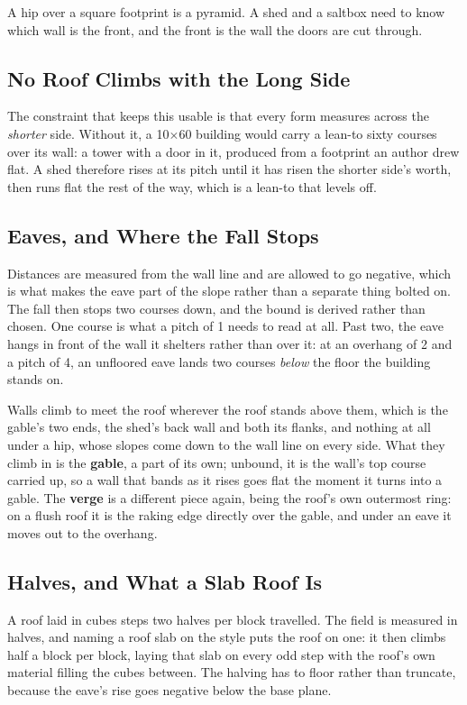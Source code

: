 A hip over a square footprint is a pyramid. A shed and a saltbox need to know which
wall is the front, and the front is the wall the doors are cut through.

\subsection{No Roof Climbs with the Long Side}

The constraint that keeps this usable is that every form measures across the
\emph{shorter} side. Without it, a 10$\times$60 building would carry a lean-to sixty
courses over its wall: a tower with a door in it, produced from a footprint an
author drew flat. A shed therefore rises at its pitch until it has risen the shorter
side's worth, then runs flat the rest of the way, which is a lean-to that levels
off.

\subsection{Eaves, and Where the Fall Stops}

Distances are measured from the wall line and are allowed to go negative, which is
what makes the eave part of the slope rather than a separate thing bolted on. The
fall then stops two courses down, and the bound is derived rather than chosen. One
course is what a pitch of 1 needs to read at all. Past two, the eave hangs in front
of the wall it shelters rather than over it: at an overhang of 2 and a pitch of 4,
an unfloored eave lands two courses \emph{below} the floor the building stands on.

Walls climb to meet the roof wherever the roof stands above them, which is the
gable's two ends, the shed's back wall and both its flanks, and nothing at all
under a hip, whose slopes come down to the wall line on every side. What they climb
in is the \textbf{gable}, a part of its own; unbound, it is the wall's top course
carried up, so a wall that bands as it rises goes flat the moment it turns into a
gable. The \textbf{verge} is a different piece again, being the roof's own
outermost ring: on a flush roof it is the raking edge directly over the gable, and
under an eave it moves out to the overhang.

\subsection{Halves, and What a Slab Roof Is}

A roof laid in cubes steps two halves per block travelled. The field is measured in
halves, and naming a roof slab on the style puts the roof on one: it then climbs
half a block per block, laying that slab on every odd step with the roof's own
material filling the cubes between. The halving has to floor rather than truncate,
because the eave's rise goes negative below the base plane.

